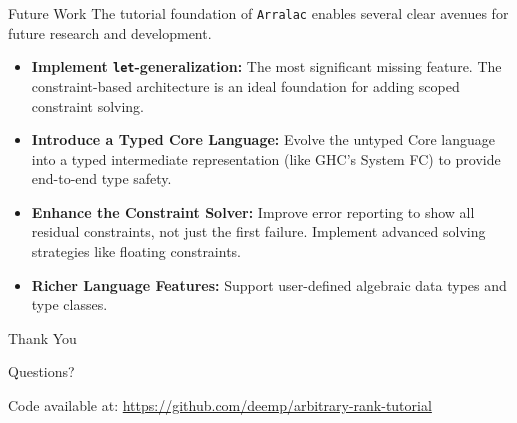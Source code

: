 \documentclass[serif, aspectratio=169]{beamer}
\begin{document}
\begin{frame}{Future Work}
  The tutorial foundation of \texttt{Arralac} enables several clear avenues for future research and development.
  \begin{itemize}
    \item \textbf{Implement \texttt{let}-generalization:} The most significant missing feature. The constraint-based architecture is an ideal foundation for adding scoped constraint solving.

    \item \textbf{Introduce a Typed Core Language:} Evolve the untyped Core language into a typed intermediate representation (like GHC's System FC) to provide end-to-end type safety.

    \item \textbf{Enhance the Constraint Solver:} Improve error reporting to show all residual constraints, not just the first failure. Implement advanced solving strategies like floating constraints.

    \item \textbf{Richer Language Features:} Support user-defined algebraic data types and type classes.
  \end{itemize}
\end{frame}

\begin{frame}
  \begin{center}
    {\Huge Thank You}
    \vspace{2em}

    Questions?

    \vspace{2em}
    Code available at: \url{https://github.com/deemp/arbitrary-rank-tutorial}
  \end{center}
\end{frame}

\end{document}
